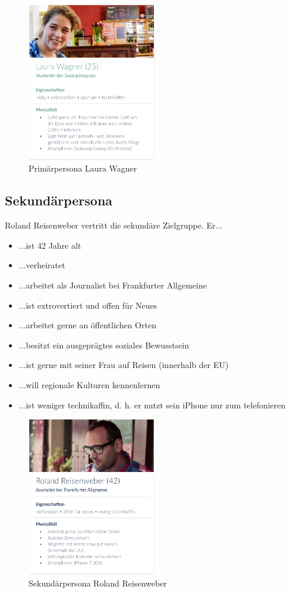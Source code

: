 \begin{figure}[h!]
    \centering
		\includegraphics[width=0.5\textwidth]{Bilder/laura.eps}
		\caption{Primärpersona Laura Wagner}
\end{figure}

\subsection{Sekundärpersona}
Roland Reisenweber vertritt die sekundäre Zielgruppe. Er...
\begin{itemize}
	\item ...ist 42 Jahre alt
	\item ...verheiratet
	\item ...arbeitet als Journalist bei Frankfurter Allgemeine
	\item ...ist extrovertiert und offen für Neues
	\item ...arbeitet gerne an öffentlichen Orten
	\item ...besitzt ein ausgeprägtes soziales Bewusstsein
	\item ...ist gerne mit seiner Frau auf Reisen (innerhalb der EU)
	\item ...will regionale Kulturen kennenlernen
	\item ...ist weniger technikaffin, d. h. er nutzt sein iPhone nur zum telefonieren
\end{itemize}

\begin{figure}[h!]
    \centering
		\includegraphics[width=0.5\textwidth]{Bilder/roland.eps}
		\caption{Sekundärpersona Roland Reisenweber}
\end{figure}

